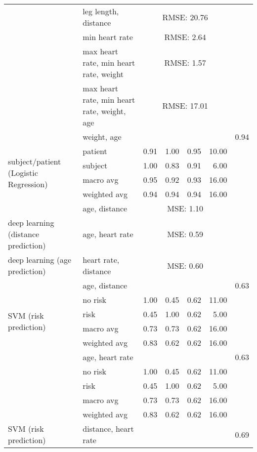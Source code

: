 \begin{longtable}{llrrrrr}
    & leg length, distance & \multicolumn{4}{c}{RMSE: 20.76} & \\
    & min heart rate & \multicolumn{4}{c}{RMSE: 2.64} & \\
    & max heart rate, min heart rate, weight & \multicolumn{4}{c}{RMSE: 1.57} & \\
    & max heart rate, min heart rate, weight, age & \multicolumn{4}{c}{RMSE: 17.01} & \\
    \midrule
    \multirow{6}{*}{subject/patient (Logistic Regression)} 
    & weight, age & & & & & 0.94 \\
    & patient & 0.91 & 1.00 & 0.95 & 10.00 & \\
    & subject & 1.00 & 0.83 & 0.91 & 6.00 & \\
    & macro avg & 0.95 & 0.92 & 0.93 & 16.00 & \\
    & weighted avg & 0.94 & 0.94 & 0.94 & 16.00 & \\
    \newpage
    \multirow{1}{*}{deep learning (heart rate prediction)} 
    & age, distance & \multicolumn{4}{c}{MSE: 1.10} & \\
    \midrule
    \multirow{1}{*}{deep learning (distance prediction)} 
    & age, heart rate & \multicolumn{4}{c}{MSE: 0.59} & \\
    \midrule
    \multirow{1}{*}{deep learning (age prediction)} 
    & heart rate, distance & \multicolumn{4}{c}{MSE: 0.60} & \\
    \midrule
    \multirow{6}{*}{SVM (risk prediction)} 
    & age, distance & & & & & 0.63 \\
    & no risk & 1.00 & 0.45 & 0.62 & 11.00 & \\
    & risk & 0.45 & 1.00 & 0.62 & 5.00 & \\
    & macro avg & 0.73 & 0.73 & 0.62 & 16.00 & \\
    & weighted avg & 0.83 & 0.62 & 0.62 & 16.00 & \\
    \midrule
    \multirow{6}{*}{SVM (risk prediction)} 
    & age, heart rate & & & & & 0.63 \\
    & no risk & 1.00 & 0.45 & 0.62 & 11.00 & \\
    & risk & 0.45 & 1.00 & 0.62 & 5.00 & \\
    & macro avg & 0.73 & 0.73 & 0.62 & 16.00 & \\
    & weighted avg & 0.83 & 0.62 & 0.62 & 16.00 & \\
    \midrule
    \multirow{6}{*}{SVM (risk prediction)} 
    & distance, heart rate & & & & & 0.69 \\

\end{longtable}
